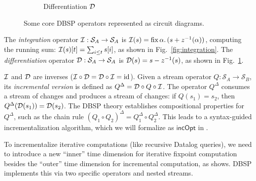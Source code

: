 \begin{figure}[ht]
\begin{subfigure}[b]{0.3\textwidth}
        \centering
        \caption{Differentiation $\mathcal{D}$}
        \label{fig:differentiation}
    \end{subfigure}
    \caption{Some core DBSP operators represented as circuit diagrams.}
    \label{fig:core-circuits}
\end{figure}

\begin{definition}\label{def:integration}
The \emph{integration} operator $\mathcal{I} : \mathcal{S}_A \to \mathcal{S}_A$ is $\mathcal{I}(s) = \mathrm{fix}\, \alpha.\, (s + z^{-1}(\alpha))$, computing the running sum: $\mathcal{I}(s)[t] = \sum_{i \leq t} s[i]$, as shown in Fig.~\ref{fig:integration}.
The \emph{differentiation} operator $\mathcal{D} : \mathcal{S}_A \to \mathcal{S}_A$ is $\mathcal{D}(s) = s - z^{-1}(s)$, as shown in Fig.~\ref{fig:differentiation}.
\end{definition}

$\mathcal{I}$ and $\mathcal{D}$ are inverses ($\mathcal{I} \circ \mathcal{D} = \mathcal{D} \circ \mathcal{I} = \mathrm{id}$).
Given a stream operator $Q : \mathcal{S}_A \to \mathcal{S}_B$, its \emph{incremental version} is defined as $Q^\Delta = \mathcal{D} \circ Q \circ \mathcal{I}$.
The operator $Q^\Delta$ consumes a stream of changes and produces a stream of changes: if $Q(s_1) = s_2$, then ${Q}^{\Delta}(\mathcal{D}(s_1))= \mathcal{D}(s_2)$. 
The DBSP theory establishes compositional properties for $Q^\Delta$, such as the chain rule $(Q_1 \circ Q_2)^\Delta = Q_1^\Delta \circ Q_2^\Delta$. This leads to a syntax-guided incrementalization algorithm, which we will formalize as $\mathsf{incOpt}$ in .

To incrementalize iterative computations (like recursive Datalog queries), we need to introduce a new ``inner'' time dimension for iterative fixpoint computation besides the ``outer'' time dimension for incremental computation, as  shows. DBSP implements this via two specific operators and nested streams.

